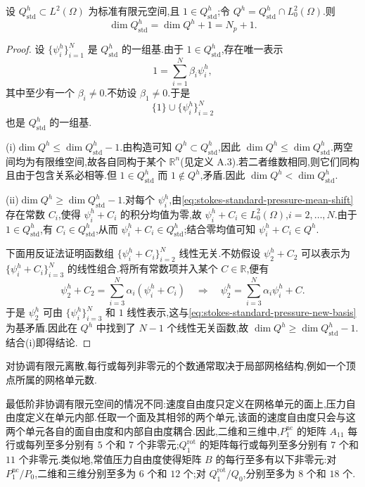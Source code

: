 \begin{lemma}\label{lem:stokes-standard-pressure-dimension}\label{lem:constant-pressure-kernel}
设 $Q_{\mathrm{std}}^h\subset L^2(\Omega)$ 为标准有限元空间,且 $1\in Q_{\mathrm{std}}^h$;令 $Q^h=Q_{\mathrm{std}}^h\cap L_0^2(\Omega)$.则
\[
  \dim Q_{\mathrm{std}}^h=\dim Q^h+1=N_p+1.
\]
\end{lemma}
\begin{proof}
设 $\{\psi_i^h\}_{i=1}^N$ 是 $Q_{\mathrm{std}}^h$ 的一组基.由于 $1\in Q_{\mathrm{std}}^h$,存在唯一表示
\[
  1=\sum_{i=1}^N\beta_i\psi_i^h,
\]
其中至少有一个 $\beta_i\ne0$.不妨设 $\beta_1\ne0$.于是
\begin{equation}\label{eq:stokes-standard-pressure-new-basis}
  \{1\}\cup\{\psi_i^h\}_{i=2}^N
\end{equation}
也是 $Q_{\mathrm{std}}^h$ 的一组基.

(i)$\dim Q^h\leq\dim Q_{\mathrm{std}}^h-1$.由构造可知 $Q^h\subset Q_{\mathrm{std}}^h$,因此 $\dim Q^h\leq\dim Q_{\mathrm{std}}^h$.两空间均为有限维空间,故各自同构于某个 $\mathbb{R}^n$(见定义 A.3).若二者维数相同,则它们同构且由于包含关系必相等.但 $1\in Q_{\mathrm{std}}^h$ 而 $1\notin Q^h$,矛盾.因此 $\dim Q^h<\dim Q_{\mathrm{std}}^h$.

(ii)$\dim Q^h\geq\dim Q_{\mathrm{std}}^h-1$.对每个 $\psi_i^h$,由\cref{eq:stokes-standard-pressure-mean-shift}存在常数 $C_i$,使得 $\psi_i^h+C_i$ 的积分均值为零,故 $\psi_i^h+C_i\in L_0^2(\Omega)$,$i=2,\ldots,N$.由于 $1\in Q_{\mathrm{std}}^h$,有 $C_i\in Q_{\mathrm{std}}^h$,从而 $\psi_i^h+C_i\in Q_{\mathrm{std}}^h$;结合零均值可知 $\psi_i^h+C_i\in Q^h$.

下面用反证法证明函数组 $\{\psi_i^h+C_i\}_{i=2}^N$ 线性无关.不妨假设 $\psi_2^h+C_2$ 可以表示为 $\{\psi_i^h+C_i\}_{i=3}^N$ 的线性组合.将所有常数项并入某个 $C\in\mathbb{R}$,便有
\[
  \psi_2^h+C_2=\sum_{i=3}^N\alpha_i(\psi_i^h+C_i)
  \quad\Longrightarrow\quad
  \psi_2^h=\sum_{i=3}^N\alpha_i\psi_i^h+C.
\]
于是 $\psi_2^h$ 可由 $\{\psi_i^h\}_{i=3}^N$ 和 $1$ 线性表示,这与\cref{eq:stokes-standard-pressure-new-basis}为基矛盾.因此在 $Q^h$ 中找到了 $N-1$ 个线性无关函数,故 $\dim Q^h\geq\dim Q_{\mathrm{std}}^h-1$.结合(i)即得结论.
\end{proof}

\begin{note}[每行或每列的矩阵非零元个数]\label{note:stokes-matrix-sparsity}
对协调有限元离散,每行或每列非零元的个数通常取决于局部网格结构,例如一个顶点所属的网格单元数.

最低阶非协调有限元空间的情况不同:速度自由度只定义在网格单元的面上,压力自由度定义在单元内部.任取一个面及其相邻的两个单元,该面的速度自由度只会与这两个单元各自的面自由度和内部自由度耦合.因此,二维和三维中,$P_1^{\mathrm{nc}}$ 的矩阵 $A_{11}$ 每行或每列至多分别有 $5$ 个和 $7$ 个非零元;$Q_1^{\mathrm{rot}}$ 的矩阵每行或每列至多分别有 $7$ 个和 $11$ 个非零元.类似地,常值压力自由度使得矩阵 $B$ 的每行至多有以下非零元:对 $P_1^{\mathrm{nc}}/P_0$,二维和三维分别至多为 $6$ 个和 $12$ 个;对 $Q_1^{\mathrm{rot}}/Q_0$,分别至多为 $8$ 个和 $18$ 个.
\end{note}

